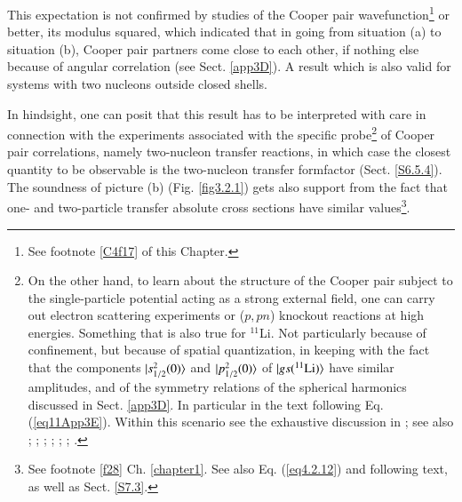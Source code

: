 This expectation is not confirmed by studies of the Cooper pair wavefunction\footnote{See footnote \ref{C4f17} of this Chapter.} or better, its modulus squared, which indicated that in going from situation (a) to situation (b), Cooper pair partners come close to each other, if nothing else because of angular correlation (see Sect. \ref{app3D}). A result which is also valid for systems with two nucleons outside closed shells. 


In hindsight, one can posit that this result has to be interpreted with care in connection   with the experiments associated with the specific probe\footnote{On the other hand, to learn about  the structure of the Cooper pair subject to the single-particle potential acting as a strong external field, one can carry out electron scattering experiments or ($p,pn$) knockout reactions at high energies. Something that is also true for $^{11}$Li. Not particularly because of confinement, but because of spatial quantization, in keeping with the fact that the components $|{s_{1/2}^2(0)} \rangle$ and $|{p_{1/2}^2(0)} \rangle$ of  $|{gs(^{11}\text{Li})} \rangle$ have similar amplitudes, and of the symmetry relations of the spherical harmonics discussed in Sect. \ref{app3D}. In particular in the text following Eq. (\ref{eq11App3E}).  Within this scenario see the exhaustive discussion in \cite{Kubota:20}; see also \cite{Hansen:87}; \cite{Bertsch:91}; \cite{Esbensen:97}; \cite{Matsuo:05}; \cite{Hagino:05}; \cite{Matsuo:06}; \cite{Hagino:07,Sagawa:07,Hagino:07b,Matsuo:13}.} of Cooper pair correlations, namely two-nucleon transfer reactions, in which case the closest quantity to be observable is the two-nucleon transfer formfactor (Sect. \ref{S6.5.4}).
 The soundness of picture (b) (Fig. \ref{fig3.2.1}) gets also support from  the fact that one- and two-particle transfer  absolute cross sections have similar values\footnote{\label{f24} See footnote \ref{f28} Ch. \ref{chapter1}. See also Eq. (\ref{eq4.2.12}) and following text, as well as Sect. \ref{S7.3}.}. 


